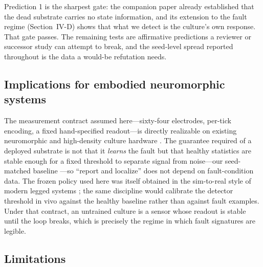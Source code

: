 Prediction 1 is the sharpest gate: the companion paper already established
that the dead substrate carries no state information, and its extension to the
fault regime (Section~IV-D) shows that what we detect is the culture's own
response. That gate passes. The remaining tests are affirmative predictions a
reviewer or successor study can attempt to break, and the seed-level spread
reported throughout is the data a would-be refutation needs.

\subsection{Implications for embodied neuromorphic systems}

The measurement contract assumed here---sixty-four electrodes, per-tick
encoding, a fixed hand-specified readout---is directly realizable on existing
neuromorphic and high-density culture hardware \cite{merolla2014,davies2018loihi,cai2023brainoware}.
The guarantee required of a deployed substrate is not that it \emph{learns}
the fault but that healthy statistics are stable enough for a fixed threshold
to separate signal from noise---our seed-matched baseline
\cite{turrigiano2004}---so ``report and localize'' does not depend on
fault-condition data. The frozen policy used here was itself obtained in the
sim-to-real style of modern legged systems \cite{hwangbo2019}; the same
discipline would calibrate the detector threshold in vivo against the healthy
baseline rather than against fault examples. Under that contract, an untrained
culture is a sensor whose readout is stable until the loop breaks, which is
precisely the regime in which fault signatures are legible.

\subsection{Limitations}

